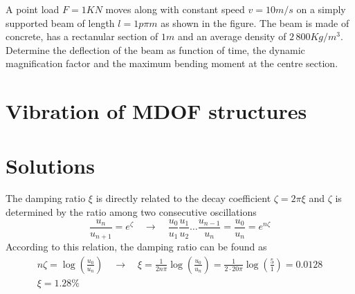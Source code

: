 \documentclass{problems}
\begin{document}
 A point load $F=1KN$ moves along with constant speed $v=10m/s$ on a simply supported beam of length $l=1p\pi m$ as shown in the figure. The beam is made of concrete, has a rectanular section of $1m$ and an average density of $2\,800Kg/m^3$. Determine the deflection of the beam as function of time, the dynamic magnification factor and the maximum bending moment at the centre section.


\section{Vibration of MDOF structures}


\newpage
\section{Solutions}







The damping ratio $\xi$ is directly related to the decay coefficient
$\zeta=2\pi\xi$ and $\zeta$ is determined by the ratio among two consecutive oscillations
$$
\frac{u_n}{u_{n+1}} = e^\zeta \quad \rightarrow \quad
\frac{u_0}{u_1} \frac{u_1}{u_2} \dots \frac{u_{n-1}}{u_n} = \frac{u_0}{u_n} = e^{n\zeta}
$$
According to this relation, the damping ratio can be found as
\begin{align*}
n\zeta = \log\left(\frac{u_0}{u_n}\right) \quad \rightarrow \quad
\xi = \frac{1}{2n\pi} \log\left(\frac{u_0}{u_n}\right) = \frac{1}{2\cdot20\pi} \log\left(\frac{5}{1}\right) = 0.0128 \\
\xi = 1.28\%
\end{align*}
\end{document}
